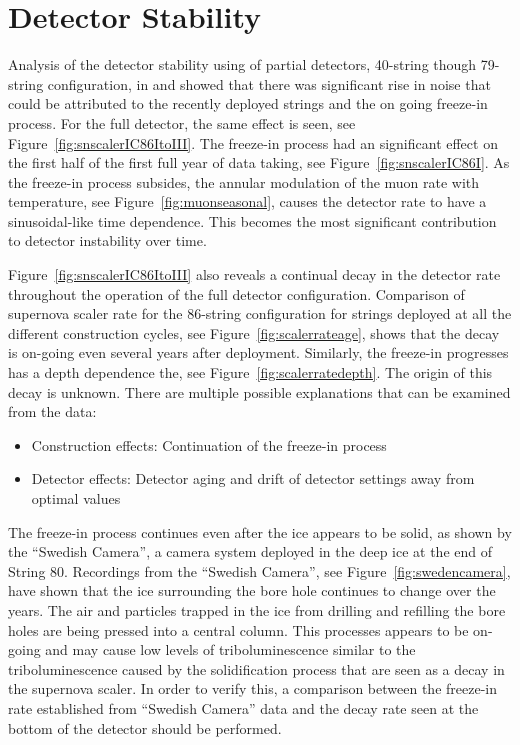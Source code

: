 \section{Detector Stability}

Analysis of the detector stability using of partial detectors, 40-string though 79-string configuration, in \cite{vbaumaster} and \cite{mkrasbergtalk} showed that there was significant rise in noise that could be attributed to the recently deployed strings and the on going freeze-in process. For the full detector, the same effect is seen, see Figure~\ref{fig:snscalerIC86ItoIII}. The freeze-in process had an significant effect on the first half of the first full year of data taking, see Figure~\ref{fig:snscalerIC86I}. As the freeze-in process subsides, the annular modulation of the muon rate with temperature, see Figure~\ref{fig:muonseasonal}, causes the detector rate to have a sinusoidal-like time dependence. This becomes the most significant contribution to detector instability over time. 

Figure~\ref{fig:snscalerIC86ItoIII} also reveals a continual decay in the detector rate throughout the operation of the full detector configuration. Comparison of supernova scaler rate for the 86-string configuration for strings deployed at all the different construction cycles, see Figure~\ref{fig:scalerrateage}, shows that the decay is on-going even several years after deployment. Similarly, the freeze-in progresses has a depth dependence the, see Figure~\ref{fig:scalerratedepth}. The origin of this decay is unknown. There are multiple possible explanations that can be examined from the data:

\begin{itemize}
  \item Construction effects: Continuation of the freeze-in process
  \item Detector effects: Detector aging and drift of detector settings away from optimal values
\end{itemize}

The freeze-in process continues even after the ice appears to be solid, as shown by the ``Swedish Camera'', a camera system deployed in the deep ice at the end of String 80. Recordings from the ``Swedish Camera'', see Figure~\ref{fig:swedencamera}, have shown that the ice surrounding the bore hole continues to change over the years. The air and particles trapped in the ice from drilling and refilling the bore holes are being pressed into a central column. This processes appears to be on-going and may cause low levels of triboluminescence similar to the triboluminescence caused by the solidification process that are seen as a decay in the supernova scaler. In order to verify this, a comparison between the freeze-in rate established from ``Swedish Camera'' data and the decay rate seen at the bottom of the detector should be performed.

